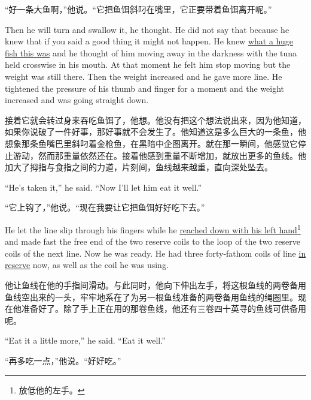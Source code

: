 \begin{paracol}{2}
\switchcolumn

“好一条大鱼啊，”他说。“它把鱼饵斜叼在嘴里，它正要带着鱼饵离开呢。”

\switchcolumn*

Then he will turn and \gls{swallow} it, he thought. He did not say that
because he knew that if you said a good thing it might not happen. He knew
\uline{what a huge fish this was} and he thought of him moving away in the darkness
with the tuna held \gls{crosswise} in his mouth. At that moment he felt him
stop moving but the weight was still there. Then the weight increased and he
gave more line. He \gls{tightened} the pressure of his thumb and finger for a
moment and the weight increased and was going straight down.

\switchcolumn

接着它就会转过身来吞吃鱼饵了，他想。他没有把这个想法说出来，因为他知道，如果你说破了一件好事，那好事就不会发生了。他知道这是多么巨大的一条鱼，他想象那条鱼嘴巴里斜叼着金枪鱼，在黑暗中企图离开。就在那一瞬间，他感觉它停止游动，然而那重量依然还在。接着他感到重量不断增加，就放出更多的鱼线。他加大了拇指与食指之间的力道，片刻间，鱼线越来越重，直向深处坠去。

\switchcolumn*

``He's taken it,'' he said. ``Now I'll let him eat it well.''

\switchcolumn

“它上钩了，”他说。“现在我要让它把鱼饵好好吃下去。”

\switchcolumn*

He let the line slip through his fingers while he \uline{reached down with
  his left hand}\footnote{放低他的左手。} and made fast the free end of the
two reserve coils to the loop of the two reserve coils of the next line. Now
he was ready. He had three forty-fathom coils of line \uline{in reserve} now,
as well as the coil he was using.

\switchcolumn

他让鱼线在他的手指间滑动。与此同时，他向下伸出左手，将这根鱼线的两卷备用鱼线空出来的一头，牢牢地系在了为另一根鱼线准备的两卷备用鱼线的绳圈里。现在他准备好了。除了手上正在用的那卷鱼线，他还有三卷四十英寻的鱼线可供备用呢。

\switchcolumn*

``Eat it a little more,'' he said. ``Eat it well.''

\switchcolumn

“再多吃一点，”他说。“好好吃。”

\switchcolumn*


\end{paracol}
